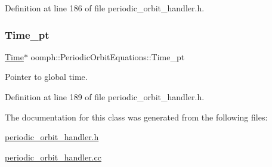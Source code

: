 Definition at line 186 of file periodic\+\_\+orbit\+\_\+handler.\+h.

\mbox{\label{classoomph_1_1PeriodicOrbitEquations_a015c732c43b83babe169d1ea3342fd66}} 
\subsubsection{\texorpdfstring{Time\+\_\+pt}{Time\_pt}}
{\footnotesize\ttfamily \hyperlink{classoomph_1_1Time}{Time}$\ast$ oomph\+::\+Periodic\+Orbit\+Equations\+::\+Time\+\_\+pt\hspace{0.3cm}{\ttfamily [private]}}



Pointer to global time. 



Definition at line 189 of file periodic\+\_\+orbit\+\_\+handler.\+h.



The documentation for this class was generated from the following files\+:\begin{DoxyCompactItemize}
\item 
\hyperlink{periodic__orbit__handler_8h}{periodic\+\_\+orbit\+\_\+handler.\+h}\item 
\hyperlink{periodic__orbit__handler_8cc}{periodic\+\_\+orbit\+\_\+handler.\+cc}\end{DoxyCompactItemize}
